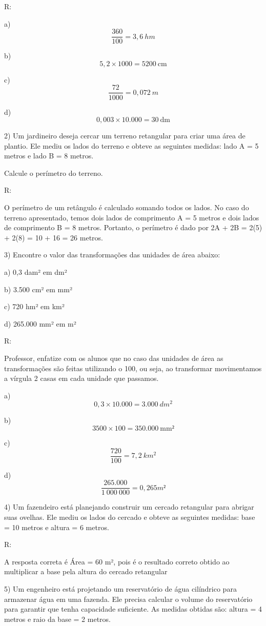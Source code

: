 R:

a) \[\frac{360}{100} = 3,6\ hm\]

b) \[5,2 \times 1000 = 5200\ \text{cm}\]

c) \[\frac{72}{1000} = 0,072\ m\]

d) \[0,003 \times 10.000 = 30\ \text{dm}\]

2) Um jardineiro deseja cercar um terreno retangular para criar uma área
de plantio. Ele mediu os lados do terreno e obteve as seguintes medidas:
lado A = 5 metros e lado B = 8 metros.

Calcule o perímetro do terreno.

R:

O perímetro de um retângulo é calculado somando todos os lados. No caso
do terreno apresentado, temos dois lados de comprimento A = 5 metros e
dois lados de comprimento B = 8 metros. Portanto, o perímetro é dado por
2A + 2B = 2(5) + 2(8) = 10 + 16 = 26 metros.

3) Encontre o valor das transformações das unidades de área abaixo:

a) 0,3 dam² em dm²

b) 3.500 cm² em mm²

c) 720 hm² em km²

d) 265.000 mm² em m²

R:

Professor, enfatize com os alunos que no caso das unidades de área as
transformações são feitas utilizando o 100, ou seja, ao transformar
movimentamos a vírgula 2 casas em cada unidade que passamos.

a) \[0,3 \times 10.000 = 3.000\ dm^{2}\]

b) \[3500 \times 100 = 350.000\ \text{mm}²\]

c) \[\frac{720}{100} = 7,2\ km^{2}\]

d) \[\frac{265.000}{1\ 000\ 000} = 0,265m²\]

4) Um fazendeiro está planejando construir um cercado retangular para
abrigar suas ovelhas. Ele mediu os lados do cercado e obteve as
seguintes medidas: base = 10 metros e altura = 6 metros.

R:

A resposta correta é Área = 60 m², pois é o resultado correto obtido ao
multiplicar a base pela altura do cercado retangular

5) Um engenheiro está projetando um reservatório de água cilíndrico para
armazenar água em uma fazenda. Ele precisa calcular o volume do
reservatório para garantir que tenha capacidade suficiente. As medidas
obtidas são: altura = 4 metros e raio da base = 2 metros.

